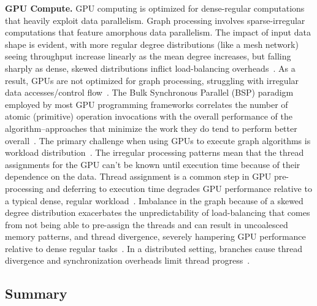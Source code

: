 \textbf{GPU Compute.}
GPU computing is optimized for dense-regular computations that heavily exploit data parallelism. 
Graph processing involves sparse-irregular computations that feature amorphous data parallelism.
The impact of input data shape is evident, with more regular degree distributions (like a mesh network) seeing throughput increase linearly as the mean degree increases, but falling sharply as dense, skewed distributions inflict load-balancing overheads~\cite{Wu2015}.
As a result, GPUs are not optimized for graph processing, struggling with irregular data accesses/control flow~\cite{Wang2016}.
The Bulk Synchronous Parallel (BSP) paradigm employed by most GPU programming frameworks correlates the number of atomic (primitive) operation invocations with the overall performance of the algorithm--approaches that minimize the work they do tend to perform better overall~\cite{Wu2015}.
The primary challenge when using GPUs to execute graph algorithms is workload distribution~\cite{Wang2016}.
The irregular processing patterns mean that the thread assignments for the GPU can't be known until execution time because of their dependence on the data. 
Thread assignment is a common step in GPU pre-processing and deferring to execution time degrades GPU performance relative to a typical dense, regular workload~\cite{Fu2014}.
Imbalance in the graph because of a skewed degree distribution exacerbates the unpredictability of load-balancing that comes from not being able to pre-assign the threads and can result in uncoalesced memory patterns, and thread divergence, severely hampering GPU performance relative to dense regular tasks~\cite{Fu2014}. 
In a distributed setting, branches cause thread divergence and synchronization overheads limit thread progress~\cite{Aananthakrishnan2020}.


    



\subsection{Summary}
\label{section:127-graph-data-structures-summary}




